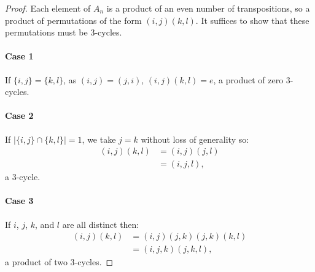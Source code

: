 \begin{proof}
    Each element of $A_n$ is a product of an even number of transpositions,
    so a product of permutations of the form $(i, j)(k, l)$. It suffices
    to show that these permutations must be $3$-cycles.

    \paragraph{Case 1} If $\{i, j\} = \{k, l\}$, as $(i, j) = (j, i)$, 
    $(i, j)(k, l) = e$, a product of zero $3$-cycles.

    \paragraph{Case 2} If $|\{i, j\} \cap \{k, l\}| = 1$, we take $j = k$
    without loss of generality so: \begin{align*}
        (i, j)(k, l)
        &= (i, j)(j, l) \\
        &= (i, j, l),
    \end{align*} a $3$-cycle.

    \paragraph{Case 3} If $i$, $j$, $k$, and $l$ are all distinct then: \begin{align*}
        (i, j)(k, l)
        &= (i, j)(j, k)(j, k)(k, l) \\
        &= (i, j, k)(j, k, l),
    \end{align*} a product of two $3$-cycles.

\end{proof}
